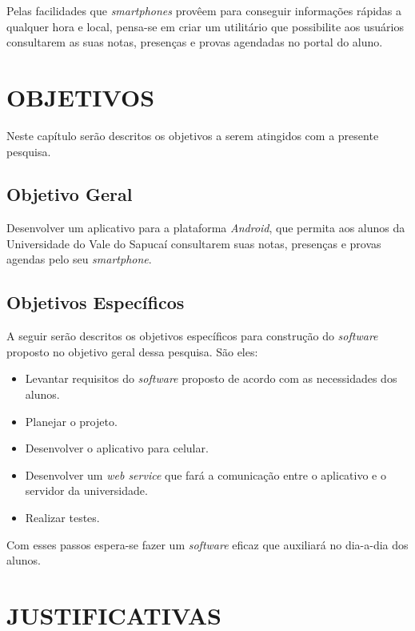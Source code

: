 	\par Pelas facilidades que \textit{smartphones} provêem para conseguir
informações rápidas a qualquer hora e local, pensa-se em criar um utilitário
que possibilite aos usuários consultarem as suas notas, presenças e provas
agendadas no portal do aluno.

\chapter{OBJETIVOS}
	
	\par Neste capítulo serão descritos os objetivos a serem atingidos com a
presente pesquisa.
	
\section{Objetivo Geral}

	\par Desenvolver um aplicativo para a plataforma \textit{Android}, que permita
aos alunos da Universidade do Vale do Sapucaí consultarem suas notas, presenças
e provas agendas pelo seu \textit{smartphone}.

\section{Objetivos Específicos}

	\par A seguir serão descritos os objetivos específicos para construção do
\textit{software} proposto no objetivo geral dessa pesquisa. São eles:
	
	\begin{itemize}
	  \item Levantar requisitos do \textit{software} proposto de acordo com as
	  necessidades dos alunos.
	  \item Planejar o projeto.
	  \item Desenvolver o aplicativo para celular.
	  \item Desenvolver um \textit{web service} que fará a comunicação entre o
	  aplicativo e o servidor da universidade.
	  \item Realizar testes.
	\end{itemize}
	
	\par Com esses passos espera-se fazer um \textit{software} eficaz que auxiliará
no dia-a-dia dos alunos.

\chapter{JUSTIFICATIVAS}

